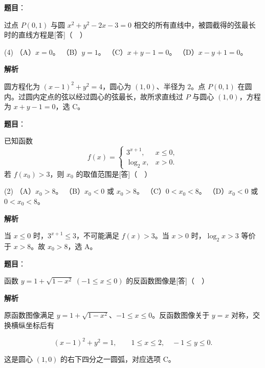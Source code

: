 \begin{answer}

\textbf{题目}：

过点 $P(0,1)$ 与圆 $x^2+y^2-2x-3=0$ 相交的所有直线中，被圆截得的弦最长时的直线方程是[答]（　）

\begin{gkopts}(4)
\task （A）$x=0$。
\task （B）$y=1$。
\task （C）$x+y-1=0$。
\task （D）$x-y+1=0$。
\end{gkopts}

\textbf{解析}

圆方程化为 $(x-1)^2+y^2=4$，圆心为 $(1,0)$、半径为 $2$。点 $P(0,1)$ 在圆内。过圆内定点的弦以经过圆心的弦最长，故所求直线过 $P$ 与圆心 $(1,0)$，方程为 $x+y-1=0$，选 C。


\end{answer}
\begin{answer}

\textbf{题目}：

已知函数
\nopagebreak[4]
\[
f(x)=\begin{cases}
3^{x+1},&x\le 0,\\
\log_2 x,&x>0.
\end{cases}
\]
若 $f(x_0)>3$，则 $x_0$ 的取值范围是[答]（　）

\begin{gkopts}(2)
\task （A）$x_0>8$。
\task （B）$x_0<0$ 或 $x_0>8$。
\task （C）$0<x_0<8$。
\task （D）$x_0<0$ 或 $0<x_0<8$。
\end{gkopts}

\textbf{解析}

当 $x\le0$ 时，$3^{x+1}\le3$，不可能满足 $f(x)>3$。当 $x>0$ 时，$\log_2x>3$ 等价于 $x>8$。故 $x_0>8$，选 A。


\end{answer}
\begin{answer}

\textbf{题目}：

函数 $y=1+\sqrt{1-x^2}\;(-1\le x\le 0)$ 的反函数图像是[答]（　）
\nopagebreak[4]
\begin{center}\end{center}
\nopagebreak[4]
\textbf{解析}

原函数图像满足 $y=1+\sqrt{1-x^2}$、$-1\le x\le0$。反函数图像关于 $y=x$ 对称，交换横纵坐标后有

\nopagebreak[4]
\[
(x-1)^2+y^2=1,\qquad 1\le x\le2,\quad -1\le y\le0.
\]

这是圆心 $(1,0)$ 的右下四分之一圆弧，对应选项 C。


\end{answer}
